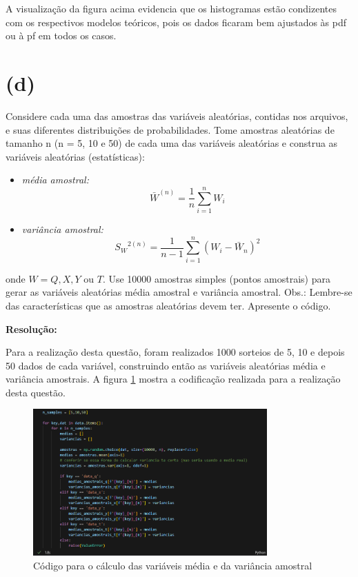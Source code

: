 \documentclass[]{abntex2}
\begin{document}
A visualização da figura acima evidencia que os histogramas estão condizentes com os respectivos modelos teóricos, pois os dados ficaram bem ajustados às pdf ou à pf em todos os casos.

\section*{\textbf{(d)}}

\noindent Considere cada uma das amostras das variáveis aleatórias, contidas nos arquivos, e suas diferentes distribuições de probabilidades. Tome amostras aleatórias de tamanho n (n = 5, 10 e 50) de cada uma das variáveis aleatórias e construa as variáveis aleatórias (estatísticas):

\begin{itemize}
    \item \textit{média amostral:} \[{\bar{W}}^{(n)}=\dfrac{1}{n} \sum_{i=1}^{n} W_i\]
    \item \textit{variância amostral:} \[{S_W}^{2(n)}=\dfrac{1}{n-1} \sum_{i=1}^{n}(W_i - \bar{W}_n)^2\]
\end{itemize}

onde $W = Q, X, Y$ ou $T$. Use 10000 amostras simples (pontos amostrais) para gerar
as variáveis aleatórias média amostral e variância amostral. Obs.: Lembre-se das
características que as amostras aleatórias devem ter. Apresente o código.

\textbf{Resolução:}

Para a realização desta questão, foram realizados 1000 sorteios de 5, 10 e depois 50 dados de cada variável, construindo então as variáveis aleatórias média e variância amostrais. A figura \ref{fig:cod} mostra a codificação realizada para a realização desta questão.

\begin{figure}
    \centering 
    \includegraphics[width=0.8\textwidth]{imgs/cod.png}
    \caption{Código para o cálculo das variáveis média e da variância amostral}
    \label{fig:cod} %
\end{figure}
\end{document}
